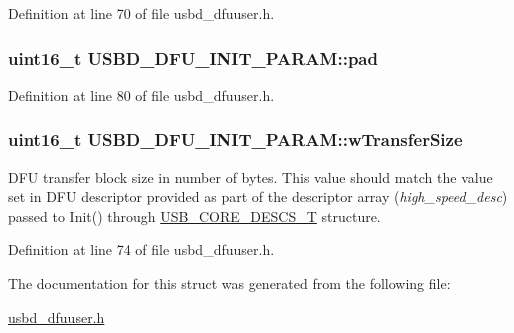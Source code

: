 Definition at line 70 of file usbd\+\_\+dfuuser.\+h.

\subsubsection[{\texorpdfstring{pad}{pad}}]{\setlength{\rightskip}{0pt plus 5cm}uint16\+\_\+t U\+S\+B\+D\+\_\+\+D\+F\+U\+\_\+\+I\+N\+I\+T\+\_\+\+P\+A\+R\+A\+M\+::pad}\hypertarget{structUSBD__DFU__INIT__PARAM_a12378565018adc1588b6fd4f12e3a5dc}{}\label{structUSBD__DFU__INIT__PARAM_a12378565018adc1588b6fd4f12e3a5dc}


Definition at line 80 of file usbd\+\_\+dfuuser.\+h.

\subsubsection[{\texorpdfstring{w\+Transfer\+Size}{wTransferSize}}]{\setlength{\rightskip}{0pt plus 5cm}uint16\+\_\+t U\+S\+B\+D\+\_\+\+D\+F\+U\+\_\+\+I\+N\+I\+T\+\_\+\+P\+A\+R\+A\+M\+::w\+Transfer\+Size}\hypertarget{structUSBD__DFU__INIT__PARAM_a497bbbfa6751823b9e288c257456b56f}{}\label{structUSBD__DFU__INIT__PARAM_a497bbbfa6751823b9e288c257456b56f}
D\+FU transfer block size in number of bytes. This value should match the value set in D\+FU descriptor provided as part of the descriptor array ({\itshape high\+\_\+speed\+\_\+desc}) passed to Init() through \hyperlink{group__USBD__Core_gabdc617d119eac0555f91bea957c41ecc}{U\+S\+B\+\_\+\+C\+O\+R\+E\+\_\+\+D\+E\+S\+C\+S\+\_\+T} structure. 

Definition at line 74 of file usbd\+\_\+dfuuser.\+h.



The documentation for this struct was generated from the following file\+:\begin{DoxyCompactItemize}
\item 
\hyperlink{usbd__dfuuser_8h}{usbd\+\_\+dfuuser.\+h}\end{DoxyCompactItemize}
